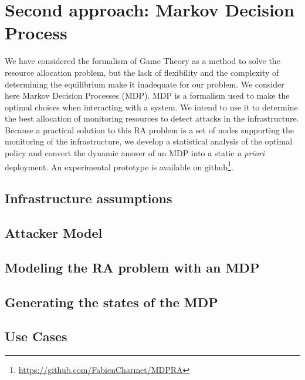 \section{Second approach: Markov Decision Process}
We have considered the formalism of Game Theory as a method to solve the resource allocation problem, but the lack of flexibility and the complexity of determining the equilibrium make it inadequate for our problem. We consider here Markov Decision Processes (MDP).
MDP is a formalism used to make the optimal choices when interacting with a system. We intend to use it to determine the best allocation of monitoring resources to detect attacks in the infrastructure. Because a practical solution to this RA problem is a set of nodes supporting the monitoring of the infrastructure, we develop a statistical analysis of the optimal policy and convert the dynamic answer of an MDP into a static \textit{a priori} deployment.
An experimental prototype is available on github\footnote{\label{github}\url{https://github.com/FabienCharmet/MDPRA}}.



% 



\subsection{Infrastructure assumptions}



\subsection{Attacker Model}


\subsection{Modeling the RA problem with an MDP}


\newpage
\subsection{Generating the states of the MDP}
 

\newpage
\subsection{Use Cases}


